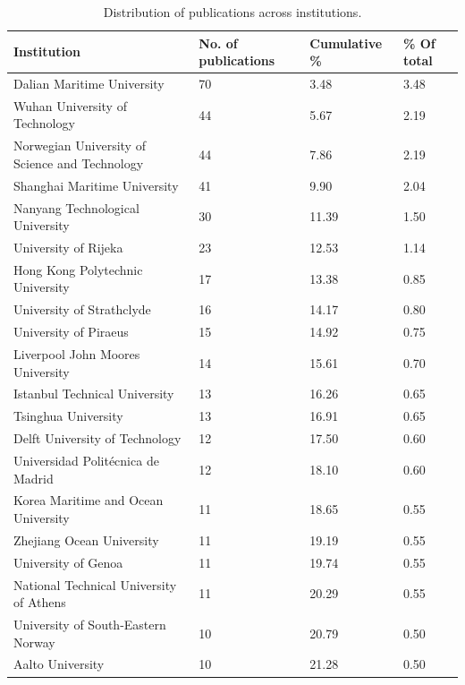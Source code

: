 \documentclass[a4paper, review, endfloat, doubleblind, authoryear]{elsarticle}
\begin{document}
	\begin{table}[h]
		\centering
		\caption{Distribution of publications across institutions.}
		\begin{tabularx}{\linewidth}{p{4cm}XXp{2cm}}
			\hline
			Institution & No. of publications & Cumulative \% & \% Of total \\
			\hline
			Dalian Maritime University & 70 & 3.48 & 3.48\\
			Wuhan University of Technology & 44 & 5.67 & 2.19\\
			Norwegian University of Science and Technology & 44 & 7.86 & 2.19\\
			Shanghai Maritime University & 41 & 9.90 & 2.04\\
			Nanyang Technological University & 30 & 11.39 & 1.50\\
			University of Rijeka & 23 & 12.53 & 1.14\\
			Hong Kong Polytechnic University & 17 & 13.38 & 0.85\\
			University of Strathclyde & 16 & 14.17 & 0.80\\
			University of Piraeus & 15 & 14.92 & 0.75\\
			Liverpool John Moores University & 14 & 15.61 & 0.70\\
			Istanbul Technical University & 13 & 16.26 & 0.65\\
			Tsinghua University & 13 & 16.91 & 0.65\\
			Delft University of Technology & 12 & 17.50 & 0.60\\
			Universidad Politécnica de Madrid & 12 & 18.10 & 0.60\\
			Korea Maritime and Ocean University & 11 & 18.65 & 0.55\\
			Zhejiang Ocean University & 11 & 19.19 & 0.55\\
			University of Genoa & 11 & 19.74 & 0.55\\
			National Technical University of Athens & 11 & 20.29 & 0.55\\
			University of South-Eastern Norway & 10 & 20.79 & 0.50\\
			Aalto University & 10 & 21.28 & 0.50\\
			\hline
		\end{tabularx}
		\label{tab:resdescinst}
	\end{table}
\end{document}
